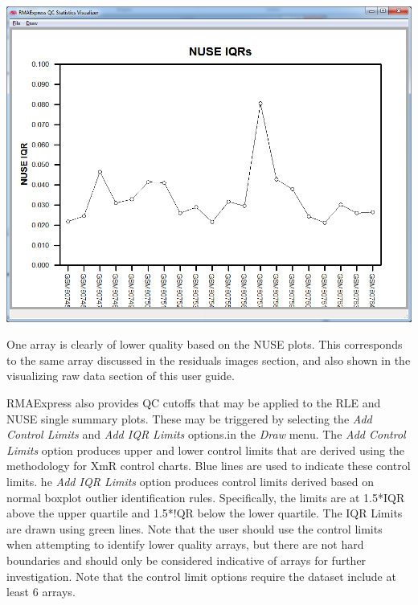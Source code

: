 \documentclass[11pt]{report}
\begin{document}
\begin{center}
\includegraphics[scale=0.4]{NUSEIQRs.png}\\
\end{center}

One array is clearly of lower quality based on the NUSE plots. This corresponds to the same array discussed in the residuals images section, and also shown in the visualizing raw data section of this user guide.

RMAExpress also provides QC cutoffs that may be applied to the RLE and NUSE single summary plots. These may be triggered by selecting the {\it Add Control Limits} and {\it Add IQR Limits} options.in the {\it Draw} menu. The {\it Add Control Limits} option produces upper and lower control limits that are derived using the methodology for XmR control charts. Blue lines are used to indicate these control limits. he {\it Add IQR Limits} option produces control limits derived based on normal boxplot outlier identification rules. Specifically, the limits are at 1.5*IQR above the upper quartile and 1.5*!QR below the lower quartile. The IQR Limits are drawn using green lines. Note that the user should use the control limits when attempting to identify lower quality arrays, but there are not hard boundaries and should only be considered indicative of arrays for further investigation. Note that the control limit options require the dataset include at least 6 arrays.
\end{document}

